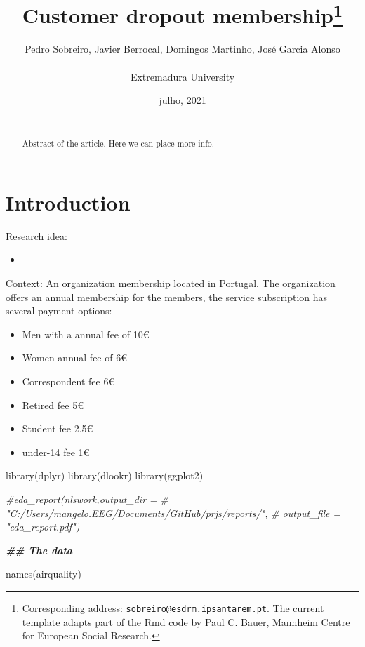 \documentclass[
  12pt,
]{article}
\title{\hfill\break
\hfill\break
\hfill\break
\vspace{1cm}Customer dropout membership\footnote{Corresponding address: \href{mailto:sobreiro@esdrm.ipsantarem.pt}{\nolinkurl{sobreiro@esdrm.ipsantarem.pt}}. The current template adapts part of the Rmd code by \href{https://github.com/paulcbauer/Writing_a_reproducable_paper_in_rmarkdown}{Paul C. Bauer}, Mannheim Centre for European Social Research.}\vspace{0.5cm}}
\author{Pedro Sobreiro, Javier Berrocal, Domingos Martinho, José Garcia Alonso\\
~\\
Extremadura University\\}
\date{\hfill\break
\hfill\break
25 julho, 2021\\
~\\}
\newenvironment{Shaded}{\begin{snugshade}}{\end{snugshade}}
\newcommand{\CommentTok}[1]{\textcolor[rgb]{0.56,0.35,0.01}{\textit{#1}}}
\newcommand{\DocumentationTok}[1]{\textcolor[rgb]{0.56,0.35,0.01}{\textbf{\textit{#1}}}}
\newcommand{\FunctionTok}[1]{\textcolor[rgb]{0.00,0.00,0.00}{#1}}
\newcommand{\NormalTok}[1]{#1}
\providecommand{\tightlist}{%
  \setlength{\itemsep}{0pt}\setlength{\parskip}{0pt}}
\begin{document}
\maketitle
\begin{abstract}
\noindent{}Abstract of the article. Here we can place more info.\vspace{.8cm}
\end{abstract}

\hypertarget{introduction}{%
\section{Introduction}\label{introduction}}

Research idea:

\begin{itemize}
\tightlist
\item
\end{itemize}

Context: An organization membership located in Portugal. The organization offers
an annual membership for the members, the service subscription has several
payment options:

\begin{itemize}
\tightlist
\item
  Men with a annual fee of 10€
\item
  Women annual fee of 6€
\item
  Correspondent fee 6€
\item
  Retired fee 5€
\item
  Student fee 2.5€
\item
  under-14 fee 1€
\end{itemize}

\clearpage

\renewcommand{\baselinestretch}{0.5}\normalsize

\renewcommand{\baselinestretch}{1.1}\normalsize

\clearpage

\begin{Shaded}
\begin{Highlighting}[]
\FunctionTok{library}\NormalTok{(dplyr)}
\FunctionTok{library}\NormalTok{(dlookr)}
\FunctionTok{library}\NormalTok{(ggplot2)}

\CommentTok{\#eda\_report(nlswork,output\_dir  = }
\CommentTok{\#   "C:/Users/mangelo.EEG/Documents/GitHub/prjs/reports/",}
\CommentTok{\#   output\_file = "eda\_report.pdf")}

\DocumentationTok{\#\# The data}

\FunctionTok{names}\NormalTok{(airquality)}
\end{Highlighting}
\end{Shaded}
\end{document}
